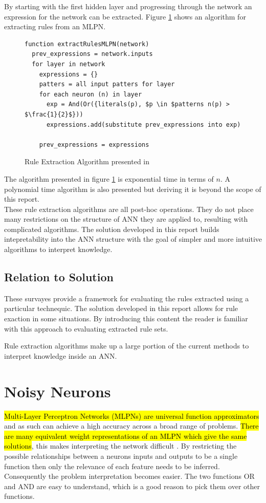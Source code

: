 By starting with the first hidden layer and progressing through the network an expression for the network can be extracted. Figure \ref{alg:rule-extraction-tsukimoto} shows an algorithm for extracting rules from an MLPN.

\begin{figure}[H]
\begin{lstlisting}[mathescape=true]
function extractRulesMLPN(network)
  prev_expressions = network.inputs
  for layer in network
    expressions = {}
    patters = all input patters for layer
    for each neuron (n) in layer
      exp = And(Or({literals(p), $p \in $patterns n(p) > $\frac{1}{2}$}))
      expressions.add(substitute prev_expressions into exp)
	  
    prev_expressions = expressions
\end{lstlisting}
	\caption{Rule Extraction Algorithm presented in \cite{tsukimoto2000extracting}}
	\label{alg:rule-extraction-tsukimoto}
\end{figure}

The algorithm presented in figure \ref{alg:rule-extraction-tsukimoto} is exponential time in terms of $n$. A polynomial time algorithm is also presented but deriving it is beyond the scope of this report.\\

These rule extraction algorithms are all post-hoc operations. They do not place many restrictions on the structure of ANN they are applied to, resulting with complicated algorithms. The solution developed in this report builds intepretability into the ANN structure with the goal of simpler and more intuitive algorithms to interpret knowledge.

\subsection{Relation to Solution}
These survayes provide a framework for evaluating the rules extracted using a particular technequic. The solution developed in this report allows for rule exaction in some situations. By introducing this content the reader is familiar with this approach to evaluating extracted rule sets.

Rule extraction algorithms make up a large portion of the current methods to interpret knowledge inside an ANN.

\section{Noisy Neurons} \label{sec:background-noisy-neurons}
\hl{Multi-Layer Perceptron Networks (MLPNs) are universal function approximators} and as such can achieve a high accuracy across a broad range of problems. \hl{There are many equivalent weight representations of an MLPN which give the same solutions}, this makes interpreting the network difficult \cite{LearningLogicalActivations}. By restricting the possible relationships between a neurons inputs and outputs to be a single function then only the relevance of each feature needs to be inferred. Consequently the problem interpretation becomes easier. The two functions OR and AND are easy to understand, which is a good reason to pick them over other functions.\\

